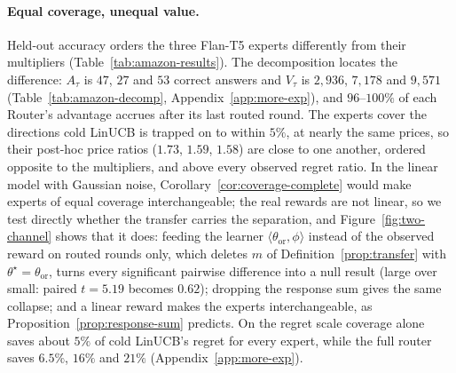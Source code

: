 \documentclass{article}
\theoremstyle{definition}
\theoremstyle{remark}
\theoremstyle{remark}
\begin{document}
\paragraph{Equal coverage, unequal value.}
Held-out accuracy orders the three Flan-T5 experts differently from their
multipliers (Table~\ref{tab:amazon-results}). The decomposition locates the difference:
$A_\tau$ is $47$, $27$ and $53$ correct answers and $V_\tau$ is $2{,}936$,
$7{,}178$ and $9{,}571$ (Table~\ref{tab:amazon-decomp},
Appendix~\ref{app:more-exp}), and $96$--$100\%$ of
each Router's advantage accrues after its last routed round. The experts
cover the directions cold LinUCB is trapped on to within $5\%$, at nearly the
same prices, so their post-hoc price ratios ($1.73$, $1.59$, $1.58$) are close
to one another, ordered opposite to the multipliers, and above every observed
regret ratio. In the linear model with Gaussian noise,
Corollary~\ref{cor:coverage-complete} would make experts of equal coverage
interchangeable; the real rewards are not linear, so we test directly whether
the transfer carries the separation, and Figure~\ref{fig:two-channel} shows
that it does: feeding the learner $\langle\theta_{\mathrm{or}},\phi\rangle$
instead of the observed reward on routed rounds only, which deletes $m$ of
Definition~\ref{prop:transfer} with $\theta^\star=\theta_{\mathrm{or}}$, turns
every significant pairwise difference into a null result (large over small:
paired $t=5.19$ becomes $0.62$); dropping the response sum gives the same
collapse; and a linear reward makes the experts interchangeable, as
Proposition~\ref{prop:response-sum} predicts. On the regret scale coverage
alone saves about $5\%$ of cold LinUCB's regret for every expert, while the
full router saves $6.5\%$, $16\%$ and $21\%$ (Appendix~\ref{app:more-exp}).
\end{document}
